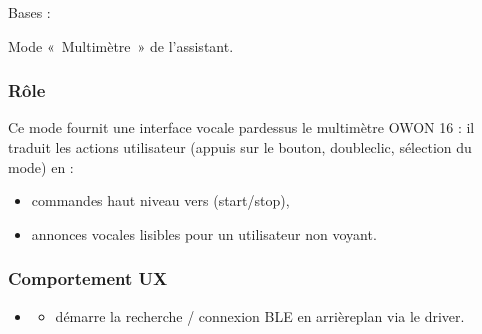 \documentclass[letterpaper,10pt,french]{sphinxmanual}
\begin{document}
\begin{fulllineitems}
\label{\detokenize{api/modes:modes.mode_multimeter.ModeMultimetre}}
\pysigstartsignatures
\pysiglinewithargsret
{}
{\sphinxparamcomma {}\sphinxparamcomma {}\sphinxparamcomma {}}
{}
\pysigstopsignatures
\sphinxAtStartPar
Bases : {\hyperref[\detokenize{api/core:core.mode_base.Mode}]{}}

\sphinxAtStartPar
Mode « Multimètre » de l’assistant.


\subsubsection{Rôle}
\label{\detokenize{api/modes:id3}}
\sphinxAtStartPar
Ce mode fournit une interface vocale par\sphinxhyphen{}dessus le multimètre OWON 16 :
il traduit les actions utilisateur (appuis sur le bouton, double\sphinxhyphen{}clic,
sélection du mode) en :
\begin{itemize}
\item {} 
\sphinxAtStartPar
commandes haut niveau vers  (start/stop),

\item {} 
\sphinxAtStartPar
annonces vocales lisibles pour un utilisateur non voyant.

\end{itemize}


\subsubsection{Comportement UX}
\label{\detokenize{api/modes:id4}}\begin{itemize}
\item {} \begin{description}
\begin{itemize}
\item {} 
\sphinxAtStartPar
démarre la recherche / connexion BLE en arrière\sphinxhyphen{}plan via le driver.


\end{itemize}
\end{description}
\end{itemize}
\end{fulllineitems}
\end{document}
